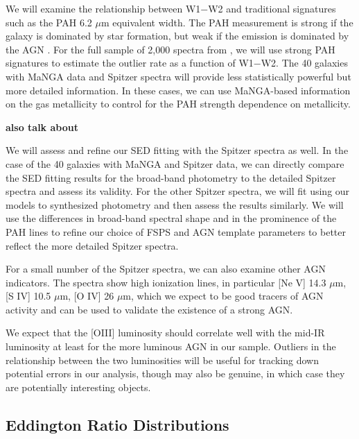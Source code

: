 \documentclass[12pt, preprint]{hacked-aastex}
\begin{document}
We will 
examine the relationship between W1$-$W2 and traditional signatures such 
as the PAH 6.2 $\mu$m equivalent width. The PAH measurement is strong
if the galaxy is dominated by star formation, but weak if the emission is 
dominated by the AGN \cite{sajina22a}. 
For the full sample of 2,000 spectra from \cite{lambrides}, 
we will use strong PAH signatures to estimate 
the outlier rate as a function of W1$-$W2. 
The 40 galaxies with MaNGA data and Spitzer spectra will provide less 
statistically powerful but more detailed information. In these cases,
we can use MaNGA-based information on the gas metallicity to 
control for the PAH strength dependence on metallicity.

{\bf also talk about }

We will assess and refine our SED fitting with the Spitzer spectra as well.
In the case of the 40 galaxies with MaNGA and Spitzer data, we can
directly compare the SED fitting results for the broad-band photometry
to the detailed Spitzer spectra and assess its validity. For the
other Spitzer spectra, we will fit using our models to synthesized
photometry and then assess the results similarly. We will use the differences
in broad-band spectral shape and in the prominence of the PAH lines to 
refine our choice of FSPS and AGN template parameters to better 
reflect the more detailed Spitzer spectra. 

For a small number of the Spitzer spectra, we can also examine other
AGN indicators. The spectra show high ionization lines, in particular
[Ne V] 14.3 $\mu$m, [S IV] 10.5 $\mu$m, 
[O IV] 26 $\mu$m, 
which we expect to be good tracers of AGN activity and can 
be used to validate the existence of a strong AGN.

We expect that
the [OIII] luminosity should correlate well with the mid-IR luminosity 
at least for the more luminous AGN in our sample. Outliers in the 
relationship between the two luminosities will be useful for tracking
down potential errors in our analysis, though may also be genuine, 
in which case they are potentially interesting objects. 

\subsection{Eddington Ratio Distributions}
\end{document}
